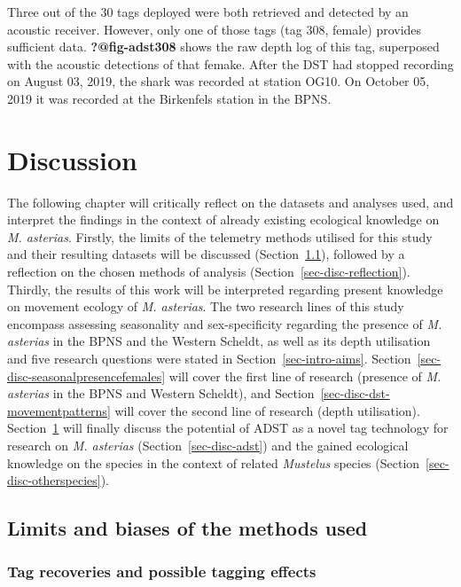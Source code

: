\documentclass[
  authoryear,
  review,
  3p]{elsarticle}
\begin{document}
Three out of the 30 tags deployed were both retrieved and detected by an
acoustic receiver. However, only one of those tags (tag 308, female)
provides sufficient data. \textbf{?@fig-adst308} shows the raw depth log
of this tag, superposed with the acoustic detections of that femake.
After the DST had stopped recording on August 03, 2019, the shark was
recorded at station OG10. On October 05, 2019 it was recorded at the
Birkenfels station in the BPNS.

\hypertarget{sec-disc}{%
\section{Discussion}\label{sec-disc}}

The following chapter will critically reflect on the datasets and
analyses used, and interpret the findings in the context of already
existing ecological knowledge on \emph{M. asterias}. Firstly, the limits
of the telemetry methods utilised for this study and their resulting
datasets will be discussed (Section~\ref{sec-disc-limits}), followed by
a reflection on the chosen methods of analysis
(Section~\ref{sec-disc-reflection}). Thirdly, the results of this work
will be interpreted regarding present knowledge on movement ecology of
\emph{M. asterias}. The two research lines of this study encompass
assessing seasonality and sex-specificity regarding the presence of
\emph{M. asterias} in the BPNS and the Western Scheldt, as well as its
depth utilisation and five research questions were stated in
Section~\ref{sec-intro-aims}.
Section~\ref{sec-disc-seasonalpresencefemales} will cover the first line
of research (presence of \emph{M. asterias} in the BPNS and Western
Scheldt), and Section~\ref{sec-disc-dst-movementpatterns} will cover the
second line of research (depth utilisation). Section~\ref{sec-disc} will
finally discuss the potential of ADST as a novel tag technology for
research on \emph{M. asterias} (Section~\ref{sec-disc-adst}) and the
gained ecological knowledge on the species in the context of related
\emph{Mustelus} species (Section~\ref{sec-disc-otherspecies}).

\hypertarget{sec-disc-limits}{%
\subsection{Limits and biases of the methods
used}\label{sec-disc-limits}}

\hypertarget{sec-disc-tagging-effects}{%
\subsubsection{Tag recoveries and possible tagging
effects}\label{sec-disc-tagging-effects}}
\end{document}
